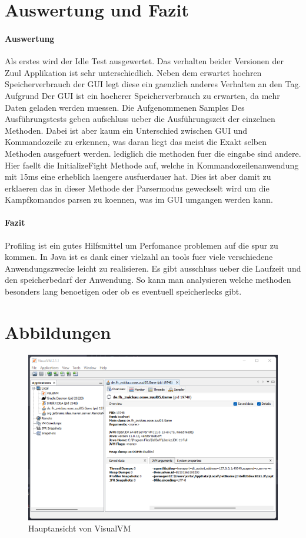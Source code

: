\documentclass{article}
\begin{document}
\section{Auswertung und Fazit}
\paragraph{Auswertung}
Als erstes wird der Idle Test ausgewertet. Das verhalten beider Versionen der Zuul Applikation ist sehr unterschiedlich. Neben dem erwartet hoehren Speicherverbrauch der GUI legt diese ein gaenzlich anderes Verhalten an den Tag. Aufgrund Der GUI ist ein hoeherer Speicherverbrauch zu erwarten, da mehr Daten geladen werden muessen. Die Aufgenommenen Samples Des Ausführungstests geben aufschluss ueber die Ausführungszeit der einzelnen Methoden. Dabei ist aber kaum ein Unterschied zwischen GUI und Kommandozeile zu erkennen, was daran liegt das meist die Exakt selben Methoden ausgefuert werden. lediglich die methoden fuer die eingabe sind andere. Hier faellt die InitializeFight Methode auf, welche in Kommandozeilenanwendung mit 15ms eine erheblich laengere ausfuerdauer hat. Dies ist aber damit zu erklaeren das in dieser Methode der Parsermodus geweckselt wird um die Kampfkomandos parsen zu koennen, was im GUI umgangen werden kann.

\paragraph{Fazit}
Profiling ist ein gutes Hilfsmittel um Perfomance problemen auf die spur zu kommen. In Java ist es dank einer vielzahl an tools fuer viele verschiedene Anwendungszwecke leicht zu realisieren. Es gibt ausschluss ueber die Laufzeit und den speicherbedarf der Anwendung. So kann man analysieren welche methoden besonders lang benoetigen oder ob es eventuell speicherlecks gibt.


 

\pagebreak
\section{Abbildungen}
\begin{figure}[h]
  \centering
  \includegraphics{VisualVM_StartPage.png}
  \caption{Hauptansicht von VisualVM}
  \label{fig:VisualVM_MainPage}
\end{figure}
\end{document}
